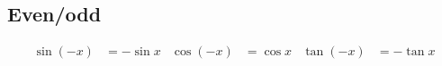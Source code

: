 \subsection*{Even/odd}

\begin{align*}
  \sin(-x)  &= - \sin x
  &\cos(-x)  &= \cos x
  &\tan(-x)  &= -\tan x
\end{align*}